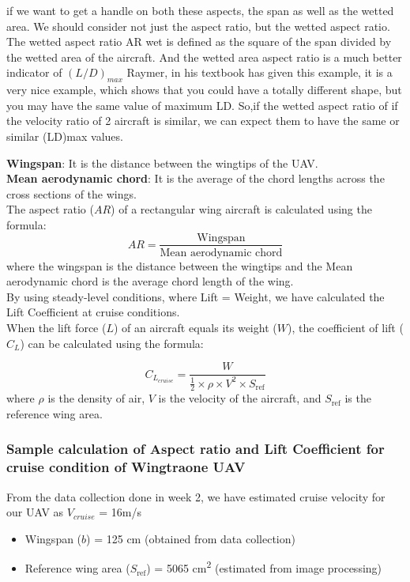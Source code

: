 \documentclass[12 pt]{article}
\begin{document}
if we want to get a handle on both these aspects, the span as well as the wetted area.
We should consider not just the aspect ratio, but the wetted aspect ratio. The wetted aspect
ratio AR wet is defined as the square of the span divided by the wetted area of the aircraft.
And the wetted area aspect ratio is a much better indicator of ${(L/D)_{max}}$
Raymer, in his textbook has given this example, it is a very nice example, which shows that
you could have a totally different shape, but you may have the same value of maximum LD.
So,if the wetted aspect ratio of if the velocity ratio of 2 aircraft is similar, we can expect them to have the same or similar (LD)max values.

\textbf{Wingspan}: It is the distance between the wingtips of the UAV.\\

\textbf{Mean aerodynamic chord}: It is the average of the chord lengths across the cross sections of the wings.\\



The aspect ratio ($AR$) of a rectangular wing aircraft is calculated using the formula:
\[
AR = \frac{{\text{Wingspan}}}{{\text{Mean aerodynamic chord}}}\]
where the wingspan is the distance between the wingtips and the Mean aerodynamic chord is the average chord length of the wing.\\
By using steady-level conditions, where Lift = Weight, we have calculated the Lift Coefficient at cruise conditions.\\
When the lift force ($L$) of an aircraft equals its weight ($W$), the coefficient of lift ($C_L$) can be calculated using the formula:

\[
C_{L_{cruise}} = \frac{W}{\frac{1}{2} \times \rho \times V^2 \times S_{\text{ref}}}
\]
where $\rho$ is the density of air, $V$ is the velocity of the aircraft, and $S_{\text{ref}}$ is the reference wing area.
\subsubsection{Sample calculation of Aspect ratio and Lift Coefficient for cruise condition of Wingtraone UAV}
From the data collection done in week 2, we have estimated cruise velocity for our UAV as $V_{cruise}$ = 16m/s
\begin{itemize}
  \item Wingspan ($b$) = 125 cm (obtained from data collection)
  \item Reference wing area ($S_{\text{ref}}$) = 5065 cm\textsuperscript{2} (estimated from image processing)
\end{itemize} 
\end{document}

